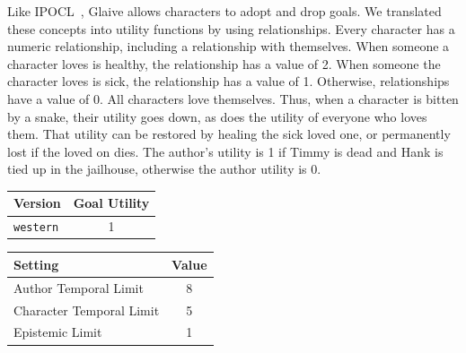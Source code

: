 \documentclass{nilreport}
\begin{document}
Like IPOCL~\cite{riedl2010narrative}, Glaive allows characters to
adopt and drop goals. We translated these concepts into utility functions
by using relationships. Every character has a numeric relationship,
including a relationship with themselves. When someone a character
loves is healthy, the relationship has a value of 2. When someone
the character loves is sick, the relationship has a value of 1. Otherwise,
relationships have a value of 0. All characters love themselves. Thus,
when a character is bitten by a snake, their utility goes down, as
does the utility of everyone who loves them. That utility can be restored
by healing the sick loved one, or permanently lost if the loved on
dies. The author's utility is 1 if Timmy is dead and Hank is tied
up in the jailhouse, otherwise the author utility is 0.

\medskip{}
\noindent{}

\medskip{}

\begin{center}
\begin{tabular}[t]{|l|c|}
\hline 
\textbf{Version} & \textbf{Goal Utility}\tabularnewline
\hline 
\hline 
\texttt{western} & 1\tabularnewline
\hline 
\end{tabular}\textbf{\quad{}}%
\begin{tabular}[t]{|l|c|}
\hline 
\textbf{Setting} & \textbf{Value}\tabularnewline
\hline 
\hline 
Author Temporal Limit & 8\tabularnewline
\hline 
Character Temporal Limit & 5\tabularnewline
\hline 
Epistemic Limit & 1\tabularnewline
\hline 
\end{tabular}
\par\end{center}
\end{document}
